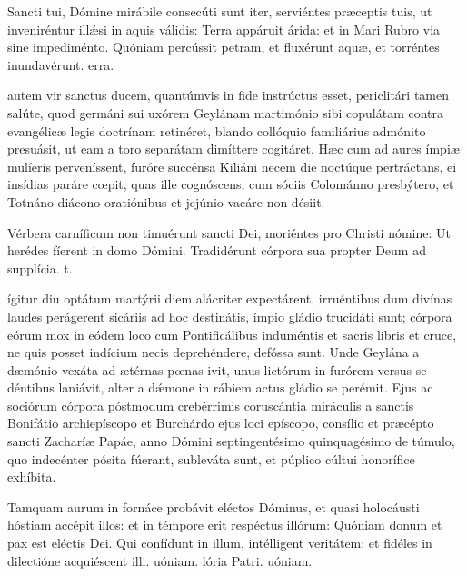 \documentclass[fontsize=9pt,paper=A6,twoside,BCOR=1mm,DIV=22,headinclude]{scrarticle}
\begin{document}
\begin{multicols}{2}
{\R Sancti tui, Dómine mirábile consecúti sunt iter, serviéntes præceptis tuis, ut inveniréntur ill\'æsi in aquis válidis: \red{*} Terra appáruit árida: et in Mari Rubro via sine impediménto.
\V Quóniam percússit petram, et fluxérunt aquæ, et torréntes inundavérunt. erra.

 autem vir sanctus ducem, quantúmvis in fide instrúctus esset, periclitári tamen salúte, quod germáni sui uxórem Geylánam martimónio sibi copulátam contra evangélicæ legis doctrínam retinéret, blando collóquio familiárius admónito presuásit, ut eam a toro separátam dimíttere cogitáret. Hæc cum ad aures ímpiæ mulíeris perveníssent, furóre succénsa Kiliáni necem die noctúque pertráctans, ei insídias paráre cœpit, quas ille cognóscens, cum sóciis Colománno presbýtero, et Totnáno diácono oratiónibus et jejúnio vacáre non désiit.

\R Vérbera carníficum non timuérunt sancti Dei, moriéntes pro Christi nómine: \red{*} Ut herédes fíerent in domo Dómini.
\V Tradidérunt córpora sua propter Deum ad supplícia. t.

}

 ígitur diu optátum martýrii diem alácriter expectárent, irruéntibus dum divínas laudes perágerent sicáriis ad hoc destinátis, ímpio gládio trucidáti sunt; córpora eórum mox in eódem loco cum Pontificálibus induméntis et sacris libris et cruce, ne quis posset indícium necis deprehéndere, defóssa sunt. Unde Geylána a dæmónio vexáta ad ætérnas pœnas ivit, unus lictórum in furórem versus se déntibus laniávit, alter a d\'æmone in rábiem actus gládio se perémit. Ejus ac sociórum córpora póstmodum crebérrimis coruscántia miráculis a sanctis Bonifátio archiepíscopo et Burchárdo ejus loci epíscopo, consílio et præcépto sancti Zacharíæ Papáe, anno Dómini septingentésimo quinquagésimo de túmulo, quo indecénter pósita fúerant, subleváta sunt, et púplico cúltui honorífice exhíbita.

\R Tamquam aurum in fornáce probávit eléctos Dóminus, et quasi holocáusti hóstiam accépit illos: et in témpore erit respéctus illórum: \red{*} Quóniam donum et pax est eléctis Dei.
\V Qui confídunt in illum, intélligent veritátem: et fidéles in dilectióne acquiéscent illi. uóniam. lória Patri. uóniam.



\end{multicols}
\end{document}
